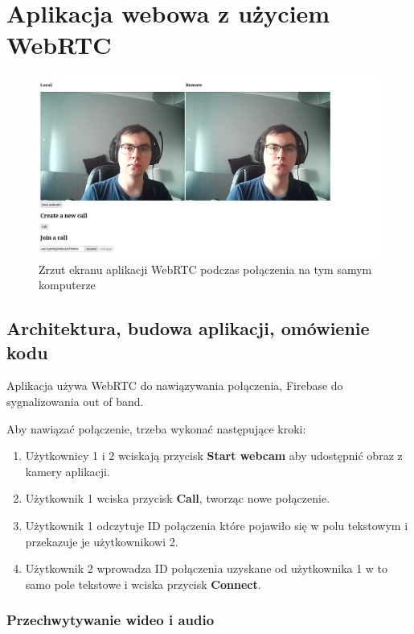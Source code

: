 \chapter{Aplikacja webowa z użyciem WebRTC}

\begin{figure}[htbp]
  \centering
  \includegraphics[width=\textwidth]{img/webrtc-app}
  \caption{Zrzut ekranu aplikacji WebRTC podczas połączenia na tym samym komputerze}
  \label{fig:webrtc_app}
\end{figure}

\section{Architektura, budowa aplikacji, omówienie kodu}

Aplikacja używa WebRTC do nawiązywania połączenia, Firebase do sygnalizowania out of band.

Aby nawiązać połączenie, trzeba wykonać następujące kroki:

\begin{enumerate}
  \item Użytkownicy 1 i 2 wciskają przycisk \textbf{Start webcam} aby udostępnić obraz z kamery aplikacji.
  \item Użytkownik 1 wciska przycisk \textbf{Call}, tworząc nowe połączenie.
  \item Użytkownik 1 odczytuje ID połączenia które pojawiło się w polu tekstowym i przekazuje je użytkownikowi 2.
  \item Użytkownik 2 wprowadza ID połączenia uzyskane od użytkownika 1 w to samo pole tekstowe i wciska przycisk
        \textbf{Connect}.
\end{enumerate}

\subsection{Przechwytywanie wideo i audio}

